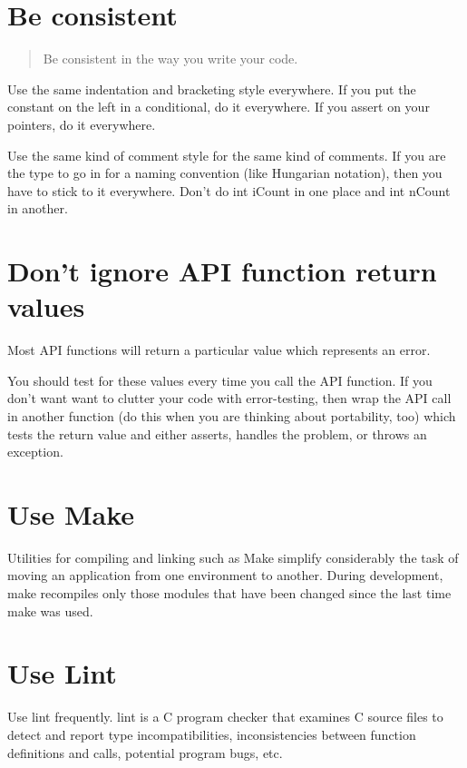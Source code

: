 \documentclass{report}
\begin{document}
	
\section{Be consistent} 
\begin{quote}
Be consistent in the way you write your code.
\end{quote}
Use the same indentation and bracketing style everywhere. If you put the constant on the left in a conditional, do it everywhere. If you assert on your pointers, do it everywhere.
 
Use the same kind of comment style for the same kind of comments. If you are the type to go in for a naming convention (like Hungarian notation), then you have to stick to it everywhere. Don't do int iCount in one place and int nCount in another.

\section{Don't ignore API function return values} 
Most API functions will return a particular value which represents an error.

You should test for these values every time you call the API function. If you don't want want to clutter your code with error-testing, then wrap the API call in another function (do this when you are thinking about portability, too) which tests the return value and either asserts, handles the problem, or throws an exception.


\section{Use Make}
Utilities for compiling and linking such as Make simplify considerably the task of moving an application from one environment to another. During development, make recompiles only those modules that have been changed since the last time make was used. 

\section{Use Lint}
Use lint frequently. lint is a C program checker that examines C source files to detect and report type incompatibilities, inconsistencies between function definitions and calls, potential program bugs, etc.
\end{document}
